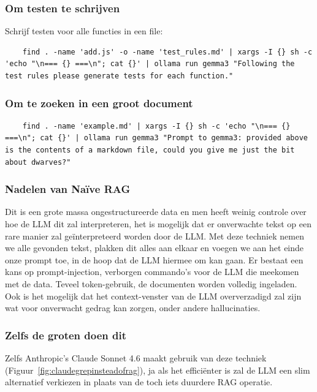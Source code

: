 \subsubsection{Om testen te schrijven}
\label{sssec:omtestenteschrijven}
Schrijf testen voor alle functies in een file:
\begin{verbatim}
    find . -name 'add.js' -o -name 'test_rules.md' | xargs -I {} sh -c 'echo "\n=== {} ===\n"; cat {}' | ollama run gemma3 "Following the test rules please generate tests for each function."
\end{verbatim}

\subsubsection{Om te zoeken in een groot document}
\label{sssec:omtezoekenineengrootdocument}
\begin{verbatim}
    find . -name 'example.md' | xargs -I {} sh -c 'echo "\n=== {} ===\n"; cat {}' | ollama run gemma3 "Prompt to gemma3: provided above is the contents of a markdown file, could you give me just the bit about dwarves?"
\end{verbatim}

\subsubsection{Nadelen van Naïve RAG}
\label{sssec:nadelenvannaiverag}
Dit is een grote massa ongestructureerde data en men heeft weinig controle over hoe de LLM dit zal interpreteren, het is mogelijk dat er onverwachte tekst op een rare manier zal geïnterpreteerd worden door de LLM. Met deze techniek nemen we alle gevonden tekst, plakken dit alles aan elkaar en voegen we aan het einde onze prompt toe, in de hoop dat de LLM hiermee om kan gaan. Er bestaat een kans op prompt-injection, verborgen commando's voor de LLM die meekomen met de data. Teveel token-gebruik, de documenten worden volledig ingeladen. Ook is het mogelijk dat het context-venster van de LLM oververzadigd zal zijn wat voor onverwacht gedrag kan zorgen, onder andere hallucinaties.

\subsubsection{Zelfs de groten doen dit}
\label{sssec:zelfsdegrotendoendit}
Zelfs Anthropic's Claude Sonnet 4.6 maakt gebruik van deze techniek (Figuur~\ref{fig:claudegrepinsteadofrag}), ja als het efficiënter is zal de LLM een slim alternatief verkiezen in plaats van de toch iets duurdere RAG operatie.

